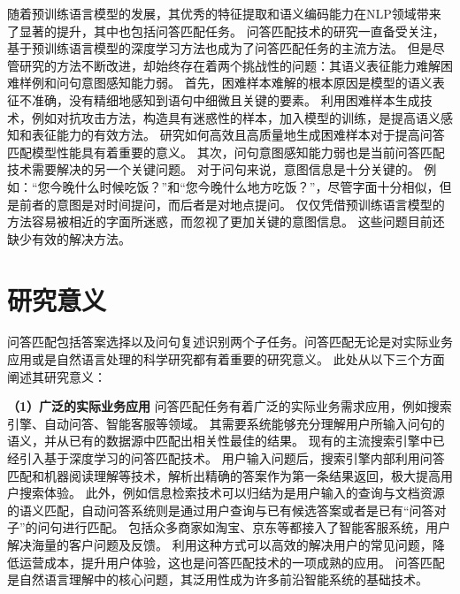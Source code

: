 随着预训练语言模型的发展，其优秀的特征提取和语义编码能力在NLP领域带来了显著的提升，其中也包括问答匹配任务。
问答匹配技术的研究一直备受关注，基于预训练语言模型的深度学习方法也成为了问答匹配任务的主流方法。
但是尽管研究的方法不断改进，却始终存在着两个挑战性的问题：其语义表征能力难解困难样例和问句意图感知能力弱。
首先，困难样本难解的根本原因是模型的语义表征不准确，没有精细地感知到语句中细微且关键的要素。
利用困难样本生成技术，例如对抗攻击方法，构造具有迷惑性的样本，加入模型的训练，是提高语义感知和表征能力的有效方法。
研究如何高效且高质量地生成困难样本对于提高问答匹配模型性能具有着重要的意义。
其次，问句意图感知能力弱也是当前问答匹配技术需要解决的另一个关键问题。
对于问句来说，意图信息是十分关键的。
例如：“您今晚什么时候吃饭？”和“您今晚什么地方吃饭？”，尽管字面十分相似，但是前者的意图是对时间提问，而后者是对地点提问。
仅仅凭借预训练语言模型的方法容易被相近的字面所迷惑，而忽视了更加关键的意图信息。
这些问题目前还缺少有效的解决方法。



\section{研究意义}
问答匹配包括答案选择以及问句复述识别两个子任务。问答匹配无论是对实际业务应用或是自然语言处理的科学研究都有着重要的研究意义。
此处从以下三个方面阐述其研究意义：

\textbf{\songti（1）广泛的实际业务应用}
问答匹配任务有着广泛的实际业务需求应用，例如搜索引擎、自动问答、智能客服等领域。
其需要系统能够充分理解用户所输入问句的语义，并从已有的数据源中匹配出相关性最佳的结果。
现有的主流搜索引擎中已经引入基于深度学习的问答匹配技术。
用户输入问题后，搜索引擎内部利用问答匹配和机器阅读理解等技术，解析出精确的答案作为第一条结果返回，极大提高用户搜索体验。
此外，例如信息检索技术可以归结为是用户输入的查询与文档资源的语义匹配，自动问答系统则是通过用户查询与已有候选答案或者是已有“问答对子”的问句进行匹配。
包括众多商家如淘宝、京东等都接入了智能客服系统，用户解决海量的客户问题及反馈。
利用这种方式可以高效的解决用户的常见问题，降低运营成本，提升用户体验，这也是问答匹配技术的一项成熟的应用。
问答匹配是自然语言理解中的核心问题，其泛用性成为许多前沿智能系统的基础技术。


